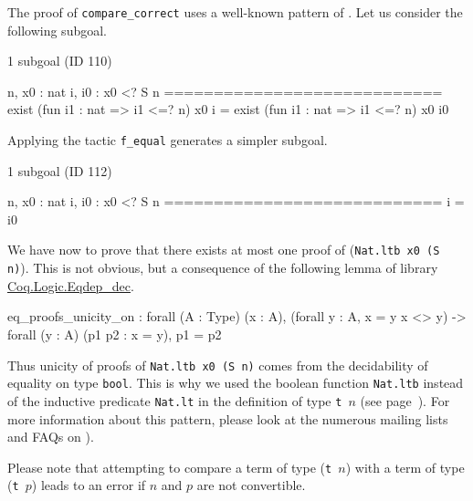 \vspace{4pt}





\begin{remark}
 The proof of \texttt{compare\_correct} uses a well-known pattern of \coq{}.
Let us consider  the following subgoal.

\begin{Coqanswer}
 1 subgoal (ID 110)
  
  n, x0 : nat
  i, i0 : x0 <? S n
  ============================
  exist (fun i1 : nat => i1 <=? n) x0 i =
  exist (fun i1 : nat => i1 <=? n) x0 i0
\end{Coqanswer}

Applying the tactic \texttt{f\_equal} generates a simpler subgoal.

\begin{Coqanswer}
1 subgoal (ID 112)
  
  n, x0 : nat
  i, i0 : x0 <? S n
  ============================
  i = i0
\end{Coqanswer}

We have now to prove that there exists at most one  proof of (\texttt{Nat.ltb x0 (S n)}). This is not obvious, but  a consequence of the following lemma of library 
\href{https://coq.inria.fr/distrib/current/stdlib/Coq.Logic.Eqdep_dec.html}{Coq.Logic.Eqdep\_dec}.

\label{sect:eq-proof-unicity}

\begin{Coqanswer}
eq_proofs_unicity_on :
forall (A : Type) (x : A),
(forall y : A, x = y \/ x <> y) -> 
forall (y : A) (p1 p2 : x = y), p1 = p2
\end{Coqanswer}

Thus unicity of proofs of \texttt{Nat.ltb x0 (S n)}  comes from the decidability of
equality on type \texttt{bool}.
This is why we used the boolean function \texttt{Nat.ltb} instead of the inductive predicate \texttt{Nat.lt} in the definition of type \texttt{t $n$} (see page~\pageref{def: Finite-ord-type}).
For more information about this pattern, please look at the numerous mailing lists and 
FAQs on \coq{}).



\end{remark}

Please note  that attempting to compare a term  of type (\texttt{t $n$}) with a term of
type (\texttt{t $p$})  leads to an error if $n$ and $p$ are not convertible.


